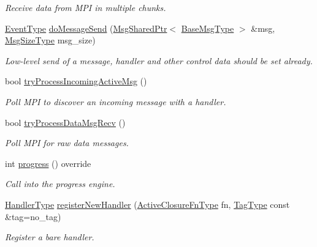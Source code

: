 \begin{DoxyCompactItemize}
\begin{DoxyCompactList}\small\item\em Receive data from M\+PI in multiple chunks. \end{DoxyCompactList}\item 
\hyperlink{namespacevt_a009267401def7ae8bf201892222d060f}{Event\+Type} \hyperlink{structvt_1_1messaging_1_1_active_messenger_aa1d3d725885993caa7836f1f5294710a}{do\+Message\+Send} (\hyperlink{structvt_1_1messaging_1_1_msg_shared_ptr}{Msg\+Shared\+Ptr}$<$ \hyperlink{namespacevt_a44d0d4e144748f2b19a1cfd962f50338}{Base\+Msg\+Type} $>$ \&msg, \hyperlink{namespacevt_a408e86a8c7c89309b52907dc5a513924}{Msg\+Size\+Type} msg\+\_\+size)
\begin{DoxyCompactList}\small\item\em Low-\/level send of a message, handler and other control data should be set already. \end{DoxyCompactList}\item 
bool \hyperlink{structvt_1_1messaging_1_1_active_messenger_a65ec9bc6f62213cac6320ea76cdd4d47}{try\+Process\+Incoming\+Active\+Msg} ()
\begin{DoxyCompactList}\small\item\em Poll M\+PI to discover an incoming message with a handler. \end{DoxyCompactList}\item 
bool \hyperlink{structvt_1_1messaging_1_1_active_messenger_af4dafc0786bb0515293356e78035a71e}{try\+Process\+Data\+Msg\+Recv} ()
\begin{DoxyCompactList}\small\item\em Poll M\+PI for raw data messages. \end{DoxyCompactList}\item 
int \hyperlink{structvt_1_1messaging_1_1_active_messenger_a4cd83c125e144ecbd9425fa7cd194538}{progress} () override
\begin{DoxyCompactList}\small\item\em Call into the progress engine. \end{DoxyCompactList}\item 
\hyperlink{namespacevt_af64846b57dfcaf104da3ef6967917573}{Handler\+Type} \hyperlink{structvt_1_1messaging_1_1_active_messenger_a018435c71415f6f10dc578230397a85c}{register\+New\+Handler} (\hyperlink{namespacevt_a2a06c34cafcd511828f16cbf1476b924}{Active\+Closure\+Fn\+Type} fn, \hyperlink{namespacevt_a84ab281dae04a52a4b243d6bf62d0e52}{Tag\+Type} const \&tag=no\+\_\+tag)
\begin{DoxyCompactList}\small\item\em Register a bare handler. \end{DoxyCompactList}\item 

\end{DoxyCompactItemize}
